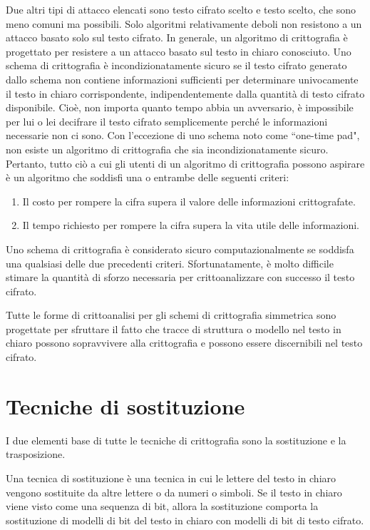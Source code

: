 Due altri tipi di attacco elencati sono testo cifrato scelto e testo scelto,
che sono meno comuni ma possibili. Solo algoritmi relativamente deboli non
resistono a un attacco basato solo sul testo cifrato. In generale, un algoritmo
di crittografia è progettato per resistere a un attacco basato sul testo in chiaro
conosciuto. Uno schema di crittografia è incondizionatamente sicuro se il
testo cifrato generato dallo schema non contiene informazioni sufficienti
per determinare univocamente il testo in chiaro corrispondente, indipendentemente
dalla quantità di testo cifrato disponibile. Cioè, non importa quanto tempo abbia
un avversario, è impossibile per lui o lei decifrare il testo cifrato
semplicemente perché le informazioni necessarie non ci sono. Con
l'eccezione di uno schema noto come ``one-time pad", non esiste
un algoritmo di crittografia che sia incondizionatamente sicuro.
Pertanto, tutto ciò a cui gli utenti di un algoritmo di crittografia
possono aspirare è un algoritmo che soddisfi una o entrambe delle
seguenti criteri:

\begin{enumerate}
    \item Il costo per rompere la cifra supera il valore delle informazioni
    crittografate.
    \item Il tempo richiesto per rompere la cifra supera la vita utile
    delle informazioni.
\end{enumerate}

Uno schema di crittografia è considerato sicuro computazionalmente se
soddisfa una qualsiasi delle due precedenti criteri. Sfortunatamente,
è molto difficile stimare la quantità di sforzo necessaria per
crittoanalizzare con successo il testo cifrato.

Tutte le forme di crittoanalisi per gli schemi di crittografia
simmetrica sono progettate per sfruttare il fatto che tracce di
struttura o modello nel testo in chiaro possono sopravvivere alla crittografia
e possono essere discernibili nel testo cifrato.
\section{Tecniche di sostituzione}
I due elementi base di tutte le tecniche di crittografia sono la sostituzione e 
la trasposizione.

Una tecnica di sostituzione è una tecnica in cui le lettere del testo in chiaro vengono 
sostituite da altre lettere o da numeri o simboli. Se il testo in chiaro 
viene visto come una sequenza di bit, allora la sostituzione comporta la sostituzione 
di modelli di bit del testo in chiaro con modelli di bit di testo cifrato.

